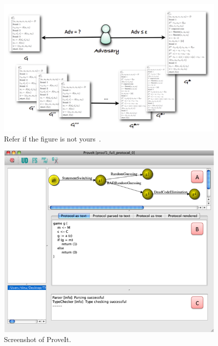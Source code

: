\documentclass[12pt]{article}
\newcommand{\proveit}{ProveIt\xspace}
\begin{document}
\begin{figure} [!ht] %
\begin{center}
\includegraphics[width=\textwidth]{game-based_proofs}
\caption{Refer if the figure is not yours~\cite{kamm12}.}
\label{fig:game-based_proofs}
\end{center}
\end{figure}


\begin{figure} [p]
\begin{center}
\includegraphics[width=\textwidth]{proveit_screenshot}
\caption{Screenshot of \proveit.}
\label{fig:proveit_screenshot}
\end{center}
\end{figure}
\end{document}
